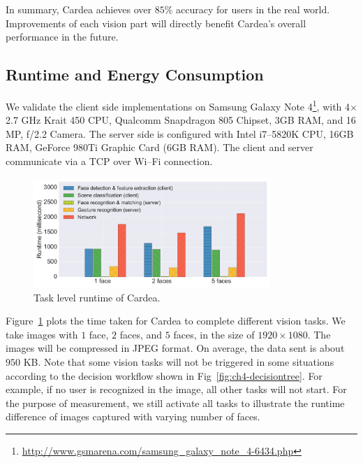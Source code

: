 In summary, Cardea achieves over $85\%$ accuracy for users in the real world. Improvements of each vision part will directly benefit Cardea's overall performance in the future.


\subsection{Runtime and Energy Consumption}
We validate the client side implementations on Samsung Galaxy Note 4\footnote{\url{http://www.gsmarena.com/samsung_galaxy_note_4-6434.php}}, with 4$\times$2.7 GHz Krait 450 CPU, Qualcomm Snapdragon 805 Chipset, 3GB RAM, and 16 MP, f/2.2 Camera. The server side is configured with Intel i7--5820K CPU, 16GB RAM, GeForce 980Ti Graphic Card (6GB RAM). The client and server communicate via a TCP over Wi--Fi connection.

\begin{figure}[tb]
\centering
\includegraphics[width=0.8\textwidth]{figure/ch4-runtime.pdf}
\caption{Task level runtime of Cardea.}
\label{fig:ch4-runtime}
\end{figure}

Figure~\ref{fig:ch4-runtime} plots the time taken for Cardea to complete different vision tasks. We take images with $1$ face, $2$ faces, and $5$ faces, in the size of $1920 \times 1080$. The images will be compressed in JPEG format. On average, the data sent is about $950$ KB. Note that some vision tasks will not be triggered in some situations according to the decision workflow shown in Fig~\ref{fig:ch4-decisiontree}. For example, if no user is recognized in the image, all other tasks will not start. For the purpose of measurement, we still activate all tasks to illustrate the runtime difference of images captured with varying number of faces.

